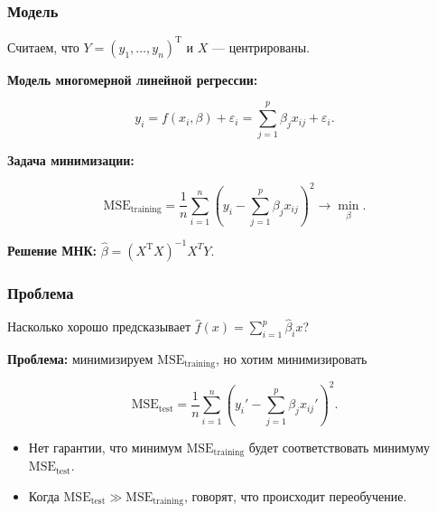 \documentclass[unicode, notheorems]{beamer}
\newcommand{\E}{\mathbb{E}}
\newcommand{\T}{\mathrm{T}}
\begin{document}
\begin{frame}
\frametitle{Модель}

Считаем, что $Y = (y_1, \ldots, y_n)^{\T}$ и $X$ --- центрированы. %
\vspace{0.8cm}

\textbf{Модель многомерной линейной регрессии:}

\[y_i = f(x_i, \beta) + \varepsilon_i = \sum_{j=1}^p \beta_j x_{ij} + \varepsilon_i.\]

\textbf{Задача минимизации: } 

\[\mathrm{MSE}_{\mathrm{training}} = \frac{1}{n}\sum_{i=1}^n(y_i - \sum_{j=1}^p \beta_j x_{ij})^2 \rightarrow \min_{\beta}.\]
\vspace{0.6cm}

\textbf{Решение МНК: } $\hat{\beta} = (X^{\T}X)^{-1} X^{T}Y.$

\end{frame}



\begin{frame}
\frametitle{Проблема}

Насколько хорошо предсказывает $\hat{f}(x) = \sum_{i=1}^p \hat{\beta}_i x$?

\vspace{0.5cm}

\textbf{Проблема:} минимизируем $\mathrm{MSE}_{\mathrm{training}}$, но хотим минимизировать 

\[\mathrm{MSE}_{\mathrm{test}} = \frac{1}{n}\sum_{i=1}^n(y_i' - \sum_{j=1}^p \beta_j x_{ij}')^2.\]
\vspace{0.3cm}

\begin{itemize}
\item Нет гарантии, что минимум $\mathrm{MSE}_{\mathrm{training}}$ будет соответствовать минимуму $\mathrm{MSE}_{\mathrm{test}}$.
\item Когда $\mathrm{MSE}_{\mathrm{test}} \gg \mathrm{MSE}_{\mathrm{training}}  $, говорят, что происходит переобучение.
\end{itemize}



\end{frame}
\end{document}
